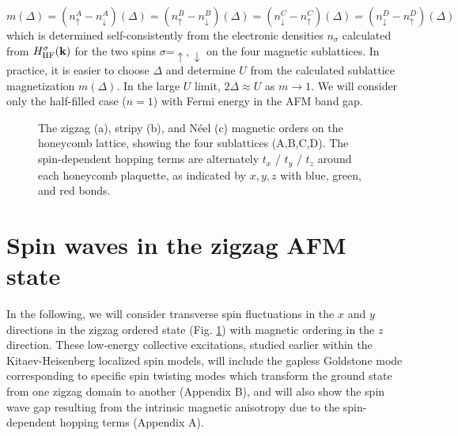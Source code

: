 \documentclass[aps,prb,fleqn,12pt,amsmath,amssymb]{revtex4}
\begin{document}
\begin{equation}
m (\Delta) 
= (n_\uparrow ^A - n_\downarrow ^A)(\Delta) 
= (n_\uparrow ^B - n_\downarrow ^B)(\Delta) 
= (n_\downarrow ^C - n_\uparrow ^C)(\Delta)
= (n_\downarrow ^D - n_\uparrow ^D)(\Delta)
\end{equation}
which is determined self-consistently from the electronic densities $n_\sigma$ calculated from $H_{\rm HF} ^\sigma (\bf k)$ for the two spins $\sigma$=$\uparrow,\downarrow$ on the four magnetic sublattices. In practice, it is easier to choose $\Delta$ and determine $U$ from the calculated sublattice magnetization $m(\Delta)$. In the large $U$ limit, $2\Delta \approx U$ as $m \rightarrow 1$. We will consider only the half-filled case ($n=1$) with Fermi energy in the AFM band gap. 
 
\begin{figure}
\vspace*{-20mm}
\hspace*{0mm}
\vspace{-15mm}
\caption{The zigzag (a), stripy (b), and N\'{e}el (c) magnetic orders on the honeycomb lattice, showing the four sublattices (A,B,C,D). The spin-dependent hopping terms are alternately $t_x$ / $t_y$ / $t_z$ around each honeycomb plaquette, as indicated by $x,y,z$ with blue, green, and red bonds.} 
\label{zigzag}
\end{figure}

\section{Spin waves in the zigzag AFM state}

In the following, we will consider transverse spin fluctuations in the $x$ and $y$ directions in the zigzag ordered state (Fig. \ref{zigzag}) with magnetic ordering in the $z$ direction. These low-energy collective excitations, studied earlier within the Kitaev-Heisenberg localized spin models,\cite{chaloupka_PRL_2010} will include the gapless Goldstone mode corresponding to specific spin twisting modes which transform the ground state from one zigzag domain to another (Appendix B), and will also show the spin wave gap resulting from the intrinsic magnetic anisotropy due to the spin-dependent hopping terms (Appendix A).    
\end{document}
